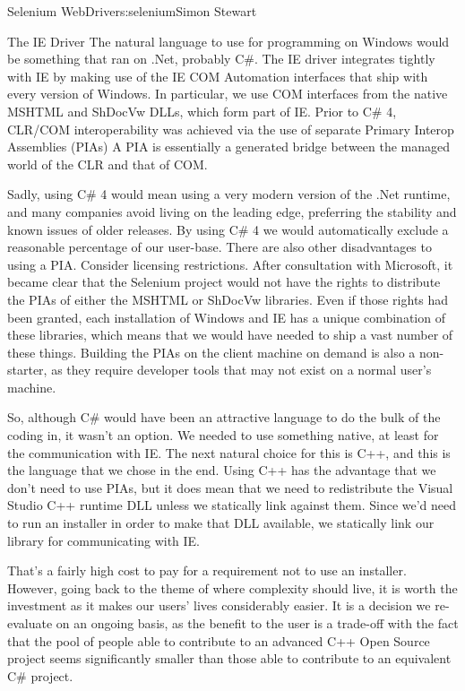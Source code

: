 \begin{aosachapter}{Selenium WebDriver}{s:selenium}{Simon Stewart}
\begin{aosasect1}{The IE Driver}
The natural language to use for programming on Windows would be
something that ran on .Net, probably C\#. The IE driver integrates
tightly with IE by making use of the IE COM Automation interfaces that
ship with every version of Windows. In particular, we use COM
interfaces from the native MSHTML and ShDocVw DLLs, which form part of
IE\@. Prior to C\# 4, CLR/COM interoperability was achieved via the use of
separate Primary Interop Assemblies (PIAs) A PIA is essentially a
generated bridge between the managed world of the CLR and that of COM.

Sadly, using C\# 4 would mean using a very modern version of the .Net
runtime, and many companies avoid living on the leading edge,
preferring the stability and known issues of older releases. By using
C\# 4 we would automatically exclude a reasonable percentage of our
user-base. There are also other disadvantages to using a PIA\@. Consider
licensing restrictions.  After consultation with Microsoft, it became
clear that the Selenium project would not have the rights to
distribute the PIAs of either the MSHTML or ShDocVw libraries. Even if
those rights had been granted, each installation of Windows and IE has
a unique combination of these libraries, which means that we would
have needed to ship a vast number of these things. Building the PIAs
on the client machine on demand is also a non-starter, as they require
developer tools that may not exist on a normal user's machine.

So, although C\# would have been an attractive language to do the bulk
of the coding in, it wasn't an option. We needed to use something
native, at least for the communication with IE\@. The next natural
choice for this is C++, and this is the language that we chose in the
end. Using C++ has the advantage that we don't need to use PIAs, but
it does mean that we need to redistribute the Visual Studio C++
runtime DLL unless we statically link against them.  Since we'd need
to run an installer in order to make that DLL available, we statically
link our library for communicating with IE.

That's a fairly high cost to pay for a requirement not to use an
installer. However, going back to the theme of where complexity should
live, it is worth the investment as it makes our users' lives
considerably easier. It is a decision we re-evaluate on an ongoing
basis, as the benefit to the user is a trade-off with the fact that
the pool of people able to contribute to an advanced C++ Open Source
project seems significantly smaller than those able to contribute to
an equivalent C\# project.


\end{aosasect1}
\end{aosachapter}

